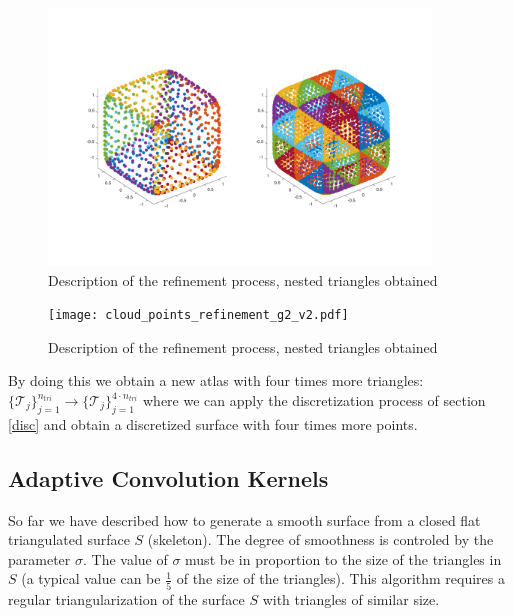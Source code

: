 \documentclass[11pt]{article}
\begin{document}
\begin{figure}[H]
\begin{center}
\includegraphics[width=4in]{cloud_points_refinement_v2.pdf}%
\end{center}
\caption{Description of the refinement process, nested triangles obtained}
\label{refinement2}
\end{figure}


\begin{figure}[H]
\begin{center}
\texttt{[image: cloud\_points\_refinement\_g2\_v2.pdf]}%
\end{center}
\caption{Description of the refinement process, nested triangles obtained}
\label{refinement3}
\end{figure}


By doing this we obtain a new atlas with four times more triangles: $\{\mathcal{T}_j\}_{j=1}^{n_{tri}}\rightarrow \{\mathcal{T}_j\}_{j=1}^{4\cdot n_{tri}}$ where we can apply the discretization process of section \ref{disc} and obtain a discretized surface with four times more points. 






\subsection{Adaptive Convolution Kernels}

So far we have described how to generate a smooth surface from a closed flat triangulated surface $\mathit{S}$ (skeleton). The degree of smoothness is controled by the parameter $\sigma$. The value of $\sigma$ must be in proportion to the size of the triangles in $\mathit{S}$ (a typical value can be $\frac{1}{5}$ of the size of the triangles). This algorithm requires a regular triangularization of the surface $\mathit{S}$ with triangles of similar size.
\end{document}
